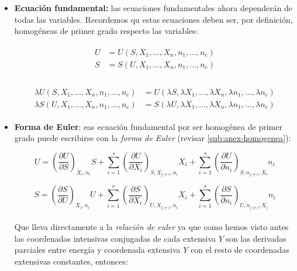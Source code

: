\documentclass[12pt,a4paper]{article}
\newcommand{\parentesis}[1]{\left( #1 \right)}
\newcommand{\parciales}[2]{\frac{\partial #1}{\partial #2}}
\begin{document}
\begin{itemize}

\item \textbf{Ecuación fundamental:} las ecuaciones fundamentales ahora dependerán de todas las variables. Recordemos qu estas ecuaciones deben ser, por definición, homogéneas de primer grado respecto las variables:

\begin{gather}
\begin{array}{ll}
U & = U(S, X_1,\ldots,X_n,n_1,\ldots,n_c) \\
S & = S(U, X_1,\ldots,X_n,n_1,\ldots,n_c)
\end{array}
\end{gather} \\

\begin{gather}
\begin{array}{ll}
\lambda U(S, X_1,\ldots,X_n,n_1,\ldots,n_c) & = U(\lambda S, \lambda  X_1,\ldots, \lambda X_n, \lambda n_1,\ldots, \lambda n_c) \\
\lambda S(U, X_1,\ldots,X_n,n_1,\ldots,n_c) & = S(\lambda U, \lambda X_1,\ldots,\lambda X_n, \lambda n_1,\ldots,\lambda n_c)
\end{array}
\end{gather}


\item \textbf{Forma de Euler}: eas ecuación fundamental por ser homogénea de primer grado puede escribirse con la \textit{forma de Euler} (revisar \ref{sub:anex-homogenea}):

\begin{equation}
U = \parentesis{\parciales{U}{S}}_{X_i, n_i} S + \sum_{i=1}^s \parentesis{\parciales{U}{X_i}}_{S, X_{j\neq i}, n_i} X_i + \sum_{i=1}^s \parentesis{\parciales{U}{n_i}}_{S, n_{j\neq i}, X_i} n_i 
\end{equation}

\begin{equation}
S = \parentesis{\parciales{S}{U}}_{X_i, n_i} U + \sum_{i=1}^s \parentesis{\parciales{S}{X_i}}_{U, X_{j\neq i}, n_i} X_i + \sum_{i=1}^s \parentesis{\parciales{S}{n_i}}_{U, n_{j\neq i}, X_i} n_i 
\end{equation} \\

Que lleva directamente a la \textit{relación de euler} ya que como hemos visto antes las coordenadas intensivas conjugadas de cada extensiva $Y$ son las derivadas parciales entre energía y coordenada extensiva $Y$ con el resto de coordenadas extensivas constantes, entonces:


\end{itemize}
\end{document}
